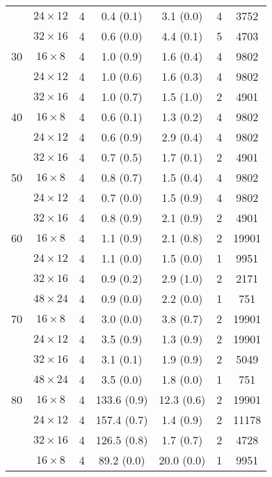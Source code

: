 \begin{longtable}{ccccccc}
    & $24 \times  12$ &  4 & 0.4 \; (0.1) & 3.1 \; (0.0) & 4 & 3752 \\
    & $32 \times  16$ &  4 & 0.6 \; (0.0) & 4.4 \; (0.1) & 5 & 4703 \\
\midrule
 30 & $16 \times   8$ &  4 & 1.0 \; (0.9) & 1.6 \; (0.4) & 4 & 9802 \\
    & $24 \times  12$ &  4 & 1.0 \; (0.6) & 1.6 \; (0.3) & 4 & 9802 \\
    & $32 \times  16$ &  4 & 1.0 \; (0.7) & 1.5 \; (1.0) & 2 & 4901 \\
\midrule
 40 & $16 \times   8$ &  4 & 0.6 \; (0.1) & 1.3 \; (0.2) & 4 & 9802 \\
    & $24 \times  12$ &  4 & 0.6 \; (0.9) & 2.9 \; (0.4) & 4 & 9802 \\
    & $32 \times  16$ &  4 & 0.7 \; (0.5) & 1.7 \; (0.1) & 2 & 4901 \\
\midrule
 50 & $16 \times   8$ &  4 & 0.8 \; (0.7) & 1.5 \; (0.4) & 4 & 9802 \\
    & $24 \times  12$ &  4 & 0.7 \; (0.0) & 1.5 \; (0.9) & 4 & 9802 \\
    & $32 \times  16$ &  4 & 0.8 \; (0.9) & 2.1 \; (0.9) & 2 & 4901 \\
\midrule
 60 & $16 \times   8$ &  4 & 1.1 \; (0.9) & 2.1 \; (0.8) & 2 & 19901 \\
    & $24 \times  12$ &  4 & 1.1 \; (0.0) & 1.5 \; (0.0) & 1 & 9951 \\
    & $32 \times  16$ &  4 & 0.9 \; (0.2) & 2.9 \; (1.0) & 2 & 2171 \\
    & $48 \times  24$ &  4 & 0.9 \; (0.0) & 2.2 \; (0.0) & 1 & 751 \\
\midrule
 70 & $16 \times   8$ &  4 & 3.0 \; (0.0) & 3.8 \; (0.7) & 2 & 19901 \\
    & $24 \times  12$ &  4 & 3.5 \; (0.9) & 1.3 \; (0.9) & 2 & 19901 \\
    & $32 \times  16$ &  4 & 3.1 \; (0.1) & 1.9 \; (0.9) & 2 & 5049 \\
    & $48 \times  24$ &  4 & 3.5 \; (0.0) & 1.8 \; (0.0) & 1 & 751 \\
\midrule
 80 & $16 \times   8$ &  4 & 133.6 \; (0.9) & 12.3 \; (0.6) & 2 & 19901 \\
    & $24 \times  12$ &  4 & 157.4 \; (0.7) & 1.4 \; (0.9) & 2 & 11178 \\
    & $32 \times  16$ &  4 & 126.5 \; (0.8) & 1.7 \; (0.7) & 2 & 4728 \\
    & $16 \times   8$ &  4 & 89.2 \; (0.0) & 20.0 \; (0.0) & 1 & 9951 \\

\end{longtable}
